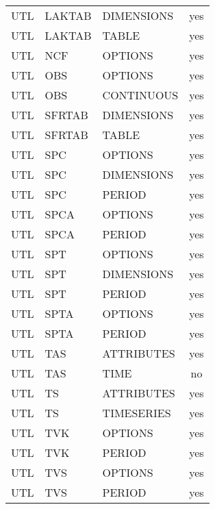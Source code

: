 \begin{longtable}{p{1.5cm} p{1.5cm} p{3cm} c}
\hline
UTL & LAKTAB & DIMENSIONS & yes \\ 
UTL & LAKTAB & TABLE & yes \\ 
\hline
UTL & NCF & OPTIONS & yes \\ 
\hline
UTL & OBS & OPTIONS & yes \\ 
UTL & OBS & CONTINUOUS & yes \\ 
\hline
UTL & SFRTAB & DIMENSIONS & yes \\ 
UTL & SFRTAB & TABLE & yes \\ 
\hline
UTL & SPC & OPTIONS & yes \\ 
UTL & SPC & DIMENSIONS & yes \\ 
UTL & SPC & PERIOD & yes \\ 
\hline
UTL & SPCA & OPTIONS & yes \\ 
UTL & SPCA & PERIOD & yes \\ 
\hline
UTL & SPT & OPTIONS & yes \\ 
UTL & SPT & DIMENSIONS & yes \\ 
UTL & SPT & PERIOD & yes \\ 
\hline
UTL & SPTA & OPTIONS & yes \\ 
UTL & SPTA & PERIOD & yes \\ 
\hline
UTL & TAS & ATTRIBUTES & yes \\ 
UTL & TAS & TIME & no \\ 
\hline
UTL & TS & ATTRIBUTES & yes \\ 
UTL & TS & TIMESERIES & yes \\ 
\hline
UTL & TVK & OPTIONS & yes \\ 
UTL & TVK & PERIOD & yes \\ 
\hline
UTL & TVS & OPTIONS & yes \\ 
UTL & TVS & PERIOD & yes \\ 


\hline
\end{longtable}
\label{table:blocks}
\normalsize

